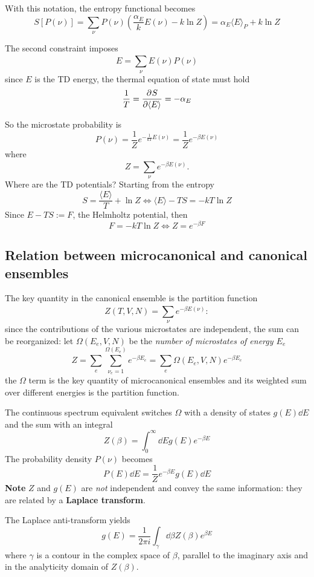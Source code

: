With this notation, the entropy functional becomes
$$S[P(\nu)] = \sum_{\nu}^{}P(\nu)\left(\frac{\alpha_E}{k}E(\nu)-k\ln Z\right) = 
\alpha_E \langle E \rangle_P + k\ln Z
$$

The second constraint imposes
$$E=\sum_{\nu}^{}E(\nu)P(\nu)$$
since $E$ is the TD energy, the thermal equation of state must hold
$$\frac{1}{T} = \pdv[]{S}{\langle E\rangle} = -\alpha_E$$

So the microstate probability is
$$P(\nu) = \frac{1}{Z}e^{-\frac{1}{kT}E(\nu)} = \frac{1}{Z}e^{-\beta E(\nu)}$$
where
$$Z = \sum_{\nu}^{}e^{-\beta E(\nu)}.$$
Where are the TD potentials? Starting from the entropy
$$S = \frac{\langle E\rangle}{T}+\ln Z\iff\langle E\rangle -TS = -kT\ln Z$$
Since $E-TS:=F$, the Helmholtz potential, then
$$F = -kT\ln Z \iff Z = e^{-\beta F}$$
\subsection{Relation between microcanonical and canonical ensembles}
The key quantity in the canonical ensemble is the partition function
$$Z(T,V,N) = \sum_{\nu}^{}e^{-\beta E(\nu)}:$$
since the contributions of the various microstates are independent, the sum
can be reorganized: let $\Omega (E_e,V,N)$ be the \textit{number of microstates
of energy $E_e$}
$$Z = \sum_{e}^{}\sum_{\nu_e=1}^{\Omega(E_e)}e^{-\beta E_e} = \sum_{e}^{}
\Omega(E_e,V,N)e^{-\beta E_e}
$$
the $\Omega$ term is the key quantity of microcanonical ensembles and its weighted
sum over different energies is the partition function.

The continuous spectrum equivalent switches $\Omega$ with a density of states
$g(E)\dd E$ and the sum with an integral
$$Z(\beta) = \int_{0}^{\infty} \dd E g(E)e^{-\beta E}$$
The probability density $P(\nu)$ becomes
$$P(E)\dd E=\frac{1}{Z}e^{-\beta E} g(E)\dd E $$
\textbf{Note} $Z$ and $g(E)$ are \textit{not} independent and convey the same
information: they are related by a \textbf{Laplace transform}.

The Laplace anti-transform yields
$$g(E) = \frac{1}{2\pi i}\int_{\gamma}^{} \dd \beta Z(\beta) e^{\beta E}$$
where $\gamma$ is a contour in the complex space of $\beta$, parallel to the
imaginary axis and in the analyticity domain of $Z(\beta)$.

